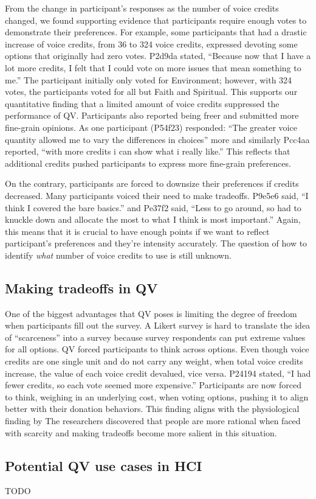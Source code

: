 From the change in participant's responses as the number of voice credits changed, we found supporting evidence that participants require enough votes to demonstrate their preferences.
For example, some participants that had a drastic increase of voice credits, from 36 to 324 voice credits, expressed devoting some options that originally had zero votes. 
P2d9da stated, ``Because now that I have a lot more credits, I felt that I could vote on more issues that mean something to me.'' The participant initially only voted for Environment; however, with 324 votes, the participants voted for all but Faith and Spiritual. This supports our quantitative finding that a limited amount of voice credits suppressed the performance of QV. Participants also reported being freer and submitted more fine-grain opinions. As one participant (P54f23) responded: ``The greater voice quantity allowed me to vary the differences in choices'' more and similarly Pcc4aa reported, ``with more credits i can show what i really like.''
This reflects that additional credits pushed participants to express more fine-grain preferences.

On the contrary, participants are forced to downsize their preferences if credits decreased. Many participants voiced their need to make tradeoffs. P9e5e6 said, ``I think I covered the bare basics.'' and Pe37f2 said, ``Less to go around, so had to knuckle down and allocate the most to what I think is most important.'' 
Again, this means that it is crucial to have enough points if we want to reflect participant's preferences and they're intensity accurately.
The question of how to identify \textit{what} number of voice credits to use is still unknown.

\subsection{Making tradeoffs in QV}
One of the biggest advantages that QV poses is limiting the degree of freedom when participants fill out the survey.
A Likert survey is hard to translate the idea of ``scarceness'' into a survey because survey respondents can put extreme values for all options. 
QV forced participants to think across options. 
Even though voice credits are one single unit and do not carry any weight, when total voice credits increase, the value of each voice credit devalued, vice versa. P24194 stated, ``I had fewer credits, so each vote seemed more expensive.''
Participants are now forced to think, weighing in an underlying cost, when voting options, pushing it to align better with their donation behaviors.
This finding aligns with the physiological finding by \textcite{Shah2015a}
The researchers discovered that people are more rational when faced with scarcity and making tradeoffs become more salient in this situation.

\subsection{Potential QV use cases in HCI}
TODO

